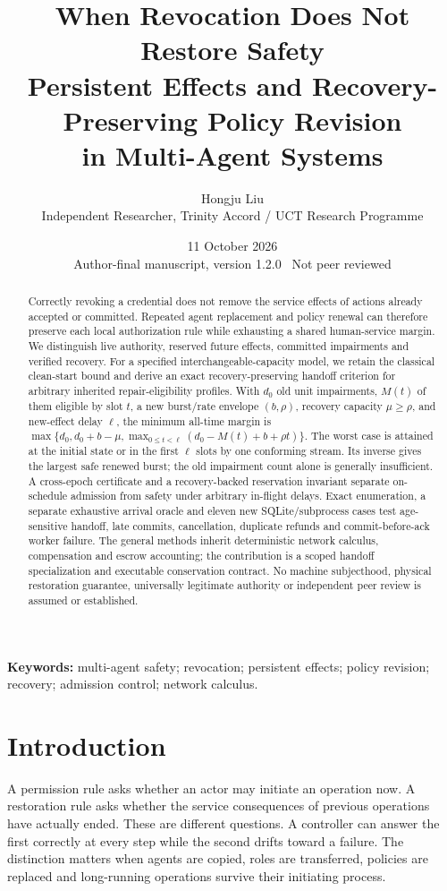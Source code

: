 \documentclass[11pt,a4paper]{article}
\title{\vspace{-1cm}\textbf{When Revocation Does Not Restore Safety}\\[6pt]
\Large Persistent Effects and Recovery-Preserving Policy Revision\\in Multi-Agent Systems}
\author{Hongju Liu\\\normalsize Independent Researcher, Trinity Accord / UCT Research Programme}
\date{11 October 2026\\\small Author-final manuscript, version 1.2.0 \textbullet\ Not peer reviewed}
\theoremstyle{definition}\newtheorem{definition}{Definition}
\begin{document}
\maketitle\thispagestyle{plain}
\begin{abstract}
Correctly revoking a credential does not remove the service effects of actions already accepted or committed. Repeated agent replacement and policy renewal can therefore preserve each local authorization rule while exhausting a shared human-service margin. We distinguish live authority, reserved future effects, committed impairments and verified recovery. For a specified interchangeable-capacity model, we retain the classical clean-start bound and derive an exact recovery-preserving handoff criterion for arbitrary inherited repair-eligibility profiles. With $d_0$ old unit impairments, $M(t)$ of them eligible by slot $t$, a new burst/rate envelope $(b,\rho)$, recovery capacity $\mu\ge\rho$, and new-effect delay $\ell$, the minimum all-time margin is $\max\{d_0,d_0+b-\mu,\max_{0\le t<\ell}(d_0-M(t)+b+\rho t)\}$. The worst case is attained at the initial state or in the first $\ell$ slots by one conforming stream. Its inverse gives the largest safe renewed burst; the old impairment count alone is generally insufficient. A cross-epoch certificate and a recovery-backed reservation invariant separate on-schedule admission from safety under arbitrary in-flight delays. Exact enumeration, a separate exhaustive arrival oracle and eleven new SQLite/subprocess cases test age-sensitive handoff, late commits, cancellation, duplicate refunds and commit-before-ack worker failure. The general methods inherit deterministic network calculus, compensation and escrow accounting; the contribution is a scoped handoff specialization and executable conservation contract. No machine subjecthood, physical restoration guarantee, universally legitimate authority or independent peer review is assumed or established.
\end{abstract}
\noindent\textbf{Keywords:} multi-agent safety; revocation; persistent effects; policy revision; recovery; admission control; network calculus.

\section{Introduction}
A permission rule asks whether an actor may initiate an operation now. A restoration rule asks whether the service consequences of previous operations have actually ended. These are different questions. A controller can answer the first correctly at every step while the second drifts toward a failure. The distinction matters when agents are copied, roles are transferred, policies are replaced and long-running operations survive their initiating process.
\end{document}
